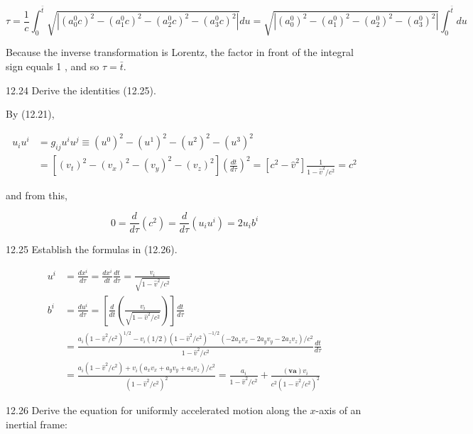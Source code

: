 \documentclass[10pt]{article}
\begin{document}
$$
\tau=\frac{1}{c} \int_{0}^{\bar{t}} \sqrt{\left|\left(a_{0}^{0} c\right)^{2}-\left(a_{1}^{0} c\right)^{2}-\left(a_{2}^{0} c\right)^{2}-\left(a_{3}^{0} c\right)^{2}\right|} d u=\sqrt{\left|\left(a_{0}^{0}\right)^{2}-\left(a_{1}^{0}\right)^{2}-\left(a_{2}^{0}\right)^{2}-\left(a_{3}^{0}\right)^{2}\right|} \int_{0}^{\bar{t}} d u
$$

Because the inverse transformation is Lorentz, the factor in front of the integral sign equals 1 , and so $\tau=\bar{t}$.

12.24 Derive the identities (12.25).

By (12.21),

$$
\begin{aligned}
u_{i} u^{i} & =g_{i j} u^{i} u^{j} \equiv\left(u^{0}\right)^{2}-\left(u^{1}\right)^{2}-\left(u^{2}\right)^{2}-\left(u^{3}\right)^{2} \\
& =\left[\left(v_{t}\right)^{2}-\left(v_{x}\right)^{2}-\left(v_{y}\right)^{2}-\left(v_{z}\right)^{2}\right]\left(\frac{d t}{d \tau}\right)^{2}=\left[c^{2}-\hat{v}^{2}\right] \frac{1}{1-\hat{v}^{2} / c^{2}}=c^{2}
\end{aligned}
$$

and from this,

$$
0=\frac{d}{d \tau}\left(c^{2}\right)=\frac{d}{d \tau}\left(u_{i} u^{i}\right)=2 u_{i} b^{i}
$$

12.25 Establish the formulas in (12.26).

$$
\begin{aligned}
u^{i} & =\frac{d x^{i}}{d \tau}=\frac{d x^{i}}{d t} \frac{d t}{d \tau}=\frac{v_{i}}{\sqrt{1-\hat{v}^{2} / c^{2}}} \\
b^{i} & =\frac{d u^{i}}{d \tau}=\left[\frac{d}{d t}\left(\frac{v_{i}}{\sqrt{1-\hat{v}^{2} / c^{2}}}\right)\right] \frac{d t}{d \tau} \\
& =\frac{a_{i}\left(1-\hat{v}^{2} / c^{2}\right)^{1 / 2}-v_{i}(1 / 2)\left(1-\hat{v}^{2} / c^{2}\right)^{-1 / 2}\left(-2 a_{x} v_{x}-2 a_{y} v_{y}-2 a_{z} v_{z}\right) / c^{2}}{1-\hat{v}^{2} / c^{2}} \frac{d t}{d \tau} \\
& =\frac{a_{i}\left(1-\hat{v}^{2} / c^{2}\right)+v_{i}\left(a_{x} v_{x}+a_{y} v_{y}+a_{z} v_{z}\right) / c^{2}}{\left(1-\hat{v}^{2} / c^{2}\right)^{2}}=\frac{a_{i}}{1-\hat{v}^{2} / c^{2}}+\frac{(\mathbf{v a}) v_{i}}{c^{2}\left(1-\hat{v}^{2} / c^{2}\right)^{2}}
\end{aligned}
$$

12.26 Derive the equation for uniformly accelerated motion along the $x$-axis of an inertial frame:
\end{document}
